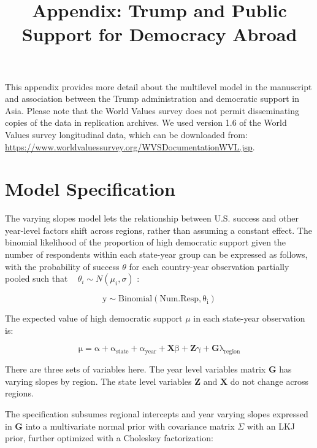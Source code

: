 \documentclass[12pt]{article}
\title{\textbf{Appendix: Trump and Public Support for Democracy Abroad}}
\date{}
\begin{document}
\maketitle 

\singlespace 

This appendix provides more detail about the multilevel model in the manuscript and association between the Trump administration and democratic support in Asia. 
Please note that the World Values survey does not permit disseminating copies of the data in replication archives. 
We used version 1.6 of the World Values survey longitudinal data, which can be downloaded from: \url{https://www.worldvaluessurvey.org/WVSDocumentationWVL.jsp}.



\section{Model Specification} 



The varying slopes model lets the relationship between U.S. success and other year-level factors shift across regions, rather than assuming a constant effect. 
The binomial likelihood of the proportion of high democratic support given the number of respondents within each state-year group can be expressed as follows, with the probability of success $\theta$ for each country-year observation partially pooled such that ~ $\theta_i \sim N(\mu_i, \sigma)$ : 


\begin{equation}
\mathrm{ y \sim Binomial(Num. Resp, \theta_i)}
\end{equation} 

The expected value of high democratic support $\mu$ in each state-year observation is:

\begin{equation}
\mathrm{ \mu = \alpha + \alpha_{state} + \alpha_{year} + \textbf{X} \beta + \textbf{Z} \gamma +  \textbf{G} \lambda_{region}} 
\end{equation} 

There are three sets of variables here. 
The year level variables matrix $\textbf{G}$ has varying slopes by region.
The state level variables $\textbf{Z}$ and $\textbf{X}$ do not change across regions. 


The specification subsumes regional intercepts and year varying slopes expressed in $\textbf{G}$ into a multivariate normal prior with covariance matrix $\Sigma$ with an LKJ prior, further optimized with a Choleskey factorization: 
\end{document}
